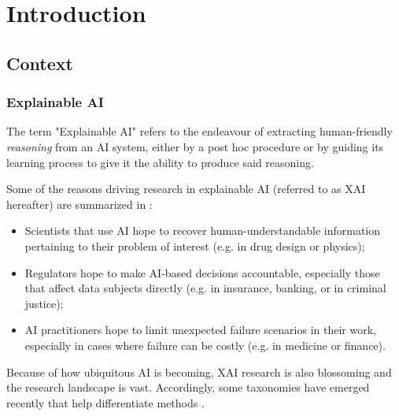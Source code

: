 \documentclass[../main.tex]{subfiles}
\begin{document}
\chapter{Introduction}
\label{ch:introduction}


\section{Context}

\subsection{Explainable AI}

The term "Explainable AI" refers to the endeavour of extracting human-friendly \emph{reasoning} from an AI system, either by a post hoc procedure or by guiding its learning process to give it the ability to produce said reasoning\citenote{}.

Some of the reasons driving research in explainable AI (referred to as XAI hereafter) are summarized in \cite{zhangSurvey2021}:
\begin{itemize}
    \item Scientists that use AI hope to recover human-understandable information pertaining to their problem of interest (e.g. in drug design or physics);
    \item Regulators hope to make AI-based decisions accountable, especially those that affect data subjects directly (e.g. in insurance, banking, or in criminal justice);
    \item AI practitioners hope to limit unexpected failure scenarios in their work, especially in cases where failure can be costly (e.g. in medicine or finance).
\end{itemize}

Because of how ubiquitous AI is becoming, XAI research is also blossoming and the research landscape is vast.
Accordingly, some taxonomies have emerged recently that help differentiate methods \cite{zhangSurvey2021, bellePrinciples2021}.
\end{document}
